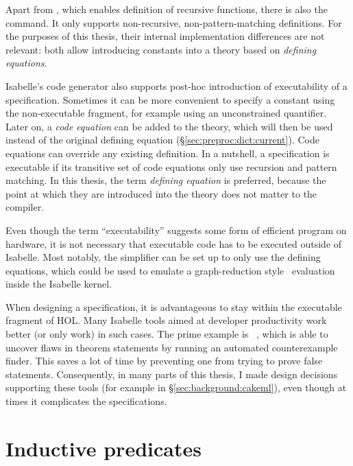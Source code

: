 Apart from , which enables definition of recursive functions, there is also the  command.
It only supports non-recursive, non-pattern-matching definitions.
For the purposes of this thesis, their internal implementation differences are not relevant: both allow introducing constants into a theory based on \emph{defining equations}.

Isabelle's code generator also supports post-hoc introduction of executability of a specification.
Sometimes it can be more convenient to specify a constant using the non-executable fragment, for example using an unconstrained quantifier.
Later on, a \emph{code equation} can be added to the theory, which will then be used instead of the original defining equation (§\ref{sec:preproc:dict:current}).
Code equations can override any existing definition.
In a nutshell, a specification is executable if its transitive set of code equations only use recursion and pattern matching.
In this thesis, the term \emph{defining equation} is preferred, because the point at which they are introduced into the theory does not matter to the compiler.

Even though the term ``executability'' suggests some form of efficient program on hardware, it is not necessary that executable code has to be executed outside of Isabelle.
Most notably, the simplifier can be set up to only use the defining equations, which could be used to emulate a graph-reduction style~\cite{hudak1989conception} evaluation inside the Isabelle kernel.

When designing a specification, it is advantageous to stay within the executable fragment of HOL.
Many Isabelle tools aimed at developer productivity work better (or only work) in such cases.
The prime example is ~\cite{bulwahn2012quickcheck}, which is able to uncover flaws in theorem statements by running an automated counterexample finder.
This saves a lot of time by preventing one from trying to prove false statements.
Consequently, in many parts of this thesis, I made design decisions supporting these tools (for example in §\ref{sec:background:cakeml}), even though at times it complicates the specifications.

\section{Inductive predicates}
\label{sec:background:inductive}

